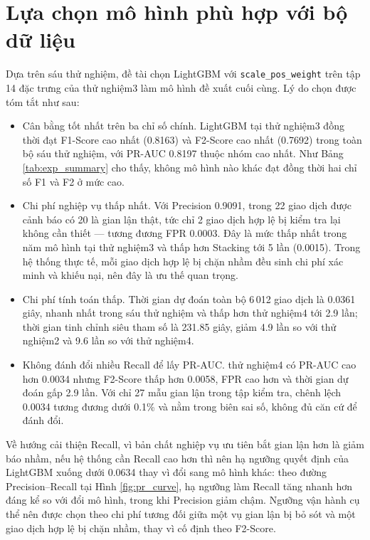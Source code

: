 \section{Lựa chọn mô hình phù hợp với bộ dữ liệu}
Dựa trên sáu thử nghiệm, đề tài chọn LightGBM với \texttt{scale\_pos\_weight} trên tập 14 đặc trưng của thử nghiệm3 làm mô hình đề xuất cuối cùng. Lý do chọn được tóm tắt như sau:

\begin{itemize}
    \item Cân bằng tốt nhất trên ba chỉ số chính. LightGBM tại thử nghiệm3 đồng thời đạt F1-Score cao nhất (0{.}8163) và F2-Score cao nhất (0{.}7692) trong toàn bộ sáu thử nghiệm, với PR-AUC 0{.}8197 thuộc nhóm cao nhất. Như Bảng \ref{tab:exp_summary} cho thấy, không mô hình nào khác đạt đồng thời hai chỉ số F1 và F2 ở mức cao.
    \item Chi phí nghiệp vụ thấp nhất. Với Precision 0{.}9091, trong 22 giao dịch được cảnh báo có 20 là gian lận thật, tức chỉ 2 giao dịch hợp lệ bị kiểm tra lại không cần thiết --- tương đương FPR 0{.}0003. Đây là mức thấp nhất trong năm mô hình tại thử nghiệm3 và thấp hơn Stacking tới 5 lần (0{.}0015). Trong hệ thống thực tế, mỗi giao dịch hợp lệ bị chặn nhầm đều sinh chi phí xác minh và khiếu nại, nên đây là ưu thế quan trọng.
    \item Chi phí tính toán thấp. Thời gian dự đoán toàn bộ 6\,012 giao dịch là 0{.}0361 giây, nhanh nhất trong sáu thử nghiệm và thấp hơn thử nghiệm4 tới 2{.}9 lần; thời gian tinh chỉnh siêu tham số là 231{.}85 giây, giảm 4{.}9 lần so với thử nghiệm2 và 9{.}6 lần so với thử nghiệm4.
    \item Không đánh đổi nhiều Recall để lấy PR-AUC. thử nghiệm4 có PR-AUC cao hơn 0{.}0034 nhưng F2-Score thấp hơn 0{.}0058, FPR cao hơn và thời gian dự đoán gấp 2{.}9 lần. Với chỉ 27 mẫu gian lận trong tập kiểm tra, chênh lệch 0{.}0034 tương đương dưới 0{.}1\% và nằm trong biên sai số, không đủ căn cứ để đánh đổi.
\end{itemize}

Về hướng cải thiện Recall, vì bản chất nghiệp vụ ưu tiên bắt gian lận hơn là giảm báo nhầm, nếu hệ thống cần Recall cao hơn thì nên hạ ngưỡng quyết định của LightGBM xuống dưới 0{.}0634 thay vì đổi sang mô hình khác: theo đường Precision--Recall tại Hình \ref{fig:pr_curve}, hạ ngưỡng làm Recall tăng nhanh hơn đáng kể so với đổi mô hình, trong khi Precision giảm chậm. Ngưỡng vận hành cụ thể nên được chọn theo chi phí tương đối giữa một vụ gian lận bị bỏ sót và một giao dịch hợp lệ bị chặn nhầm, thay vì cố định theo F2-Score.

